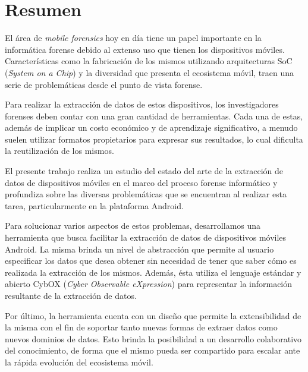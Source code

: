 \chapter*{Resumen}
El área de \emph{mobile forensics} hoy en día tiene un papel importante en la informática forense debido al extenso uso que tienen los dispositivos móviles. Características como la fabricación de los mismos utilizando arquitecturas SoC (\emph{System on a Chip}) y la diversidad que presenta el ecosistema móvil, traen una serie de problemáticas desde el punto de vista forense.

Para realizar la extracción de datos de estos dispositivos, los investigadores forenses deben contar con una gran cantidad de herramientas. Cada una de estas, además de implicar un costo económico y de aprendizaje significativo, a menudo suelen utilizar formatos propietarios para expresar sus resultados, lo cual dificulta la reutilización de los mismos.

El presente trabajo realiza un estudio del estado del arte de la extracción de datos de dispositivos móviles en el marco del proceso forense informático y profundiza sobre las diversas problemáticas que se encuentran al realizar esta tarea, particularmente en la plataforma Android.

Para solucionar varios aspectos de estos problemas, desarrollamos una herramienta que busca facilitar la extracción de datos de dispositivos móviles Android. La misma brinda un nivel de abstracción que permite al usuario especificar los datos que desea obtener sin necesidad de tener que saber cómo es realizada la extracción de los mismos. Además, ésta utiliza el lenguaje estándar y abierto CybOX (\emph{Cyber Observable eXpression}) para representar la información resultante de la extracción de datos.

Por último, la herramienta cuenta con un diseño que permite la extensibilidad de la misma con el fin de soportar tanto nuevas formas de extraer datos como nuevos dominios de datos. Esto brinda la posibilidad a un desarrollo colaborativo del conocimiento, de forma que el mismo pueda ser compartido para escalar ante la rápida evolución del ecosistema móvil.
